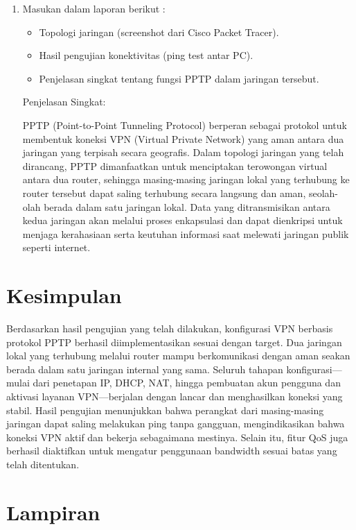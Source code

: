 \begin{enumerate}
\begin{center}
    \end{center}
    \item Masukan dalam laporan berikut :
    \begin{itemize}
        \item Topologi jaringan (screenshot dari Cisco Packet Tracer).
        \item Hasil pengujian konektivitas (ping test antar PC).
        \item Penjelasan singkat tentang fungsi PPTP dalam jaringan tersebut.
    \end{itemize}
    Penjelasan Singkat:

    PPTP (Point-to-Point Tunneling Protocol) berperan sebagai protokol untuk membentuk koneksi VPN (Virtual Private Network) yang aman antara dua jaringan yang terpisah secara geografis. Dalam topologi jaringan yang telah dirancang, PPTP dimanfaatkan untuk menciptakan terowongan virtual antara dua router, sehingga masing-masing jaringan lokal yang terhubung ke router tersebut dapat saling terhubung secara langsung dan aman, seolah-olah berada dalam satu jaringan lokal. Data yang ditransmisikan antara kedua jaringan akan melalui proses enkapsulasi dan dapat dienkripsi untuk menjaga kerahasiaan serta keutuhan informasi saat melewati jaringan publik seperti internet.

\end{enumerate}
\section{Kesimpulan}
Berdasarkan hasil pengujian yang telah dilakukan, konfigurasi VPN berbasis protokol PPTP berhasil diimplementasikan sesuai dengan target. Dua jaringan lokal yang terhubung melalui router mampu berkomunikasi dengan aman seakan berada dalam satu jaringan internal yang sama. Seluruh tahapan konfigurasi—mulai dari penetapan IP, DHCP, NAT, hingga pembuatan akun pengguna dan aktivasi layanan VPN—berjalan dengan lancar dan menghasilkan koneksi yang stabil. Hasil pengujian menunjukkan bahwa perangkat dari masing-masing jaringan dapat saling melakukan ping tanpa gangguan, mengindikasikan bahwa koneksi VPN aktif dan bekerja sebagaimana mestinya. Selain itu, fitur QoS juga berhasil diaktifkan untuk mengatur penggunaan bandwidth sesuai batas yang telah ditentukan.

\section{Lampiran}
